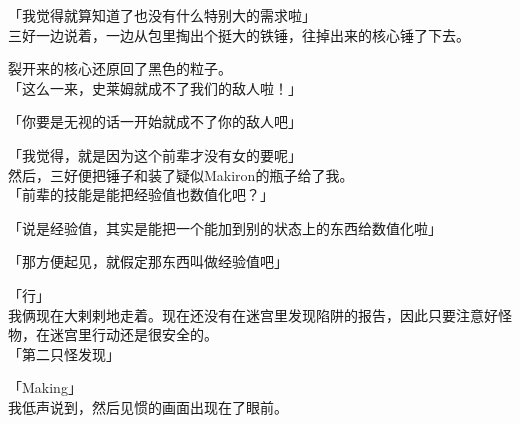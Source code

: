 「我觉得就算知道了也没有什么特别大的需求啦」\\

三好一边说着，一边从包里掏出个挺大的铁锤，往掉出来的核心锤了下去。

裂开来的核心还原回了黑色的粒子。\\

「这么一来，史莱姆就成不了我们的敌人啦！」

「你要是无视的话一开始就成不了你的敌人吧」

「我觉得，就是因为这个前辈才没有女的要呢」\\

然后，三好便把锤子和装了疑似Makiron的瓶子给了我。\\

「前辈的技能是能把经验值也数值化吧？」

「说是经验值，其实是能把一个能加到别的状态上的东西给数值化啦」

「那方便起见，就假定那东西叫做经验值吧」

「行」\\

我俩现在大剌剌地走着。现在还没有在迷宫里发现陷阱的报告，因此只要注意好怪物，在迷宫里行动还是很安全的。\\

「第二只怪发现」

「Making」\\

我低声说到，然后见惯的画面出现在了眼前。\\

